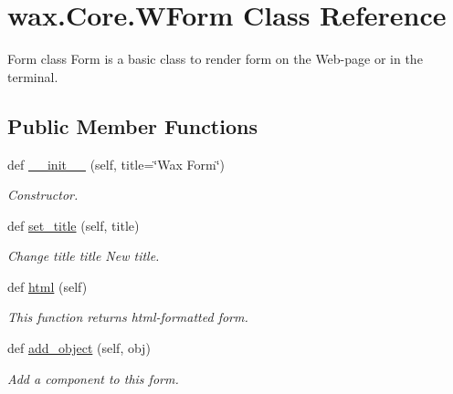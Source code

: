 \hypertarget{classwax_1_1Core_1_1WForm}{}\section{wax.\+Core.\+W\+Form Class Reference}
\label{classwax_1_1Core_1_1WForm}


Form class Form is a basic class to render form on the Web-\/page or in the terminal.  


\subsection*{Public Member Functions}
\begin{DoxyCompactItemize}
\item 
def \hyperlink{classwax_1_1Core_1_1WForm_ae21d181e9ad6153bceda8265a6e9ce8c}{\+\_\+\+\_\+init\+\_\+\+\_\+} (self, title=\char`\"{}Wax Form\char`\"{})
\begin{DoxyCompactList}\small\item\em Constructor. \end{DoxyCompactList}\item 
def \hyperlink{classwax_1_1Core_1_1WForm_a9d093d9e1309adf5b8be93add1b8a692}{set\+\_\+title} (self, title)\hypertarget{classwax_1_1Core_1_1WForm_a9d093d9e1309adf5b8be93add1b8a692}{}\label{classwax_1_1Core_1_1WForm_a9d093d9e1309adf5b8be93add1b8a692}

\begin{DoxyCompactList}\small\item\em Change title title New title. \end{DoxyCompactList}\item 
def \hyperlink{classwax_1_1Core_1_1WForm_ade1b1967b65f7f5a91a64ea6e82314cd}{html} (self)\hypertarget{classwax_1_1Core_1_1WForm_ade1b1967b65f7f5a91a64ea6e82314cd}{}\label{classwax_1_1Core_1_1WForm_ade1b1967b65f7f5a91a64ea6e82314cd}

\begin{DoxyCompactList}\small\item\em This function returns html-\/formatted form. \end{DoxyCompactList}\item 
def \hyperlink{classwax_1_1Core_1_1WForm_ad63eb68566b51859cd2271be2c73e1ad}{add\+\_\+object} (self, obj)
\begin{DoxyCompactList}\small\item\em Add a component to this form. \end{DoxyCompactList}\end{DoxyCompactItemize}


